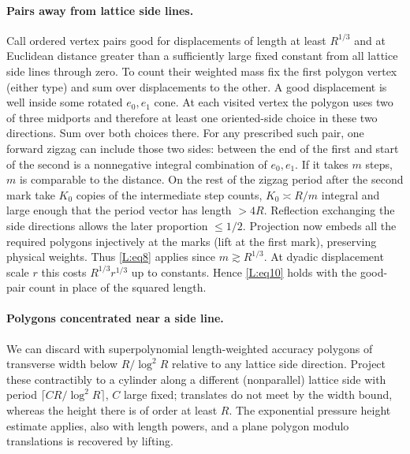 \documentclass[11pt]{article}
\numberwithin{equation}{section}
\theoremstyle{definition}\newtheorem{definition}[theorem]{Definition}
\theoremstyle{remark}\newtheorem{remark}[theorem]{Remark}
\begin{document}
\paragraph{Pairs away from lattice side lines.}
Call ordered vertex pairs good for displacements of length at least \(R^{1/3}\) and at Euclidean distance greater than a sufficiently large fixed constant from all lattice side lines through zero. To count their weighted mass fix the first polygon vertex (either type) and sum over displacements to the other. A good displacement is well inside some rotated \(e_0,e_1\) cone. At each visited vertex the polygon uses two of three midports and therefore at least one oriented-side choice in these two directions. Sum over both choices there. For any prescribed such pair, one forward zigzag can include those two sides: between the end of the first and start of the second is a nonnegative integral combination of \(e_0,e_1\). If it takes \(m\) steps, \(m\) is comparable to the distance. On the rest of the zigzag period after the second mark take \(K_0\) copies of the intermediate step counts, \(K_0\asymp R/m\) integral and large enough that the period vector has length \(>4R\). Reflection exchanging the side directions allows the later proportion \(\le1/2\). Projection now embeds all the required polygons injectively at the marks (lift at the first mark), preserving physical weights. Thus \eqref{L:eq8} applies since \(m\gtrsim R^{1/3}\). At dyadic displacement scale \(r\) this costs \(R^{1/3} r^{1/3}\) up to constants. Hence \eqref{L:eq10} holds with the good-pair count in place of the squared length.

\paragraph{Polygons concentrated near a side line.}
We can discard with superpolynomial length-weighted accuracy polygons of transverse width below \(R/\log^2 R\) relative to any lattice side direction. Project these contractibly to a cylinder along a different (nonparallel) lattice side with period \(\lceil C R/\log^2 R\rceil\), \(C\) large fixed; translates do not meet by the width bound, whereas the height there is of order at least \(R\). The exponential pressure height estimate applies, also with length powers, and a plane polygon modulo translations is recovered by lifting.
\end{document}
